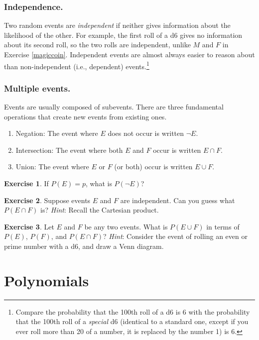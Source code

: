 \documentclass{book}
\theoremstyle{definition}
\newtheorem{exercise}{Exercise}[chapter]
\theoremstyle{colonstylebf}
\begin{document}
\subsubsection*{Independence.}
Two random events are \emph{independent} if neither gives information about the likelihood of the other. For example, the first roll of a d6 gives no information about its second roll, so the two rolls are independent, unlike $M$ and $F$ in Exercise \ref{magiccoin}. Independent events are almost always easier to reason about than non-independent (i.e., dependent) events.\footnote{Compare the probability that the 100th roll of a d6 is 6 with the probability that the 100th roll of a \emph{special} d6 (identical to a standard one, except if you ever roll more than 20 of a number, it is replaced by the number 1) is 6.}

\subsubsection*{Multiple events.}
Events are usually composed of subevents. There are three fundamental operations that create new events from existing ones.
\begin{enumerate}[label = (\arabic*)]
\item Negation: The event where $E$ does not occur is written $\neg E$.
\item\label{intersection} Intersection:
The event where both $E$ and $F$ occur is written $\displaystyle E \cap F$.
\item Union:  The event where $E$ or $F$ (or both) occur is written $E \cup F$.
\end{enumerate}

\begin{exercise}\label{q:neg}
If $P(E) = p$, what is $P(\neg E)$?
\end{exercise}
\begin{exercise}\label{q:cap}
Suppose events $E$ and $F$ are independent. Can you guess what $\displaystyle P(E \cap F)$ is? \emph{Hint}: Recall the Cartesian product.
\end{exercise}
\begin{exercise}\label{q:cup}
Let $E$ and $F$ be any two events. What is $P(E \cup F)$ in terms of $P(E)$, $P(F)$, and $\displaystyle P(E \cap F)$? \emph{Hint}: Consider the event of rolling an even or prime number with a d6, and draw a Venn diagram.
\end{exercise}


\section{Polynomials}
\end{document}
